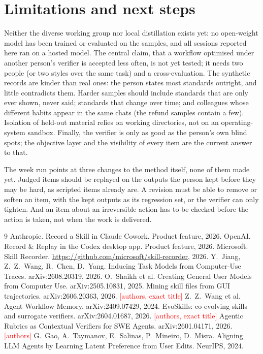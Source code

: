 \documentclass[10pt]{article}
\newcommand{\todo}[1]{\textcolor{red}{[#1]}}
\begin{document}
\section{Limitations and next steps}

Neither the diverse working group nor local distillation exists yet: no open-weight model has been trained or
evaluated on the samples, and all sessions reported here ran on a hosted model. The central claim, that a
workflow optimised under another person's verifier is accepted less often, is not yet tested; it needs two people (or two styles over the same task) and a cross-evaluation. The synthetic records are
kinder than real ones: the person states most standards outright, and little contradicts them. Harder samples
should include standards that are only ever shown, never said; standards that change over time; and colleagues
whose different habits appear in the same chats (the refund samples contain a few). Isolation of held-out material
relies on working directories, not on an operating-system sandbox. Finally, the verifier is only as good as the
person's own blind spots; the objective layer and the visibility of every item are the current answer to that.

The week run points at three changes to the method itself, none of them made yet. Judged items should be replayed
on the outputs the person kept before they may be hard, as scripted items already are. A revision must be able to
remove or soften an item, with the kept outputs as its regression set, or the verifier can only tighten. And an
item about an irreversible action has to be checked before the action is taken, not when the work is delivered.

\begin{thebibliography}{9}\small
{} Anthropic. Record a Skill in Claude Cowork. Product feature, 2026.
 OpenAI. Record \& Replay in the Codex desktop app. Product feature, 2026.
 Microsoft. Skill Recorder. \url{https://github.com/microsoft/skill-recorder}, 2026.
 Y.~Jiang, Z.~Z.~Wang, R.~Chen, D.~Yang. Inducing Task Models from Computer-Use Traces. arXiv:2608.20319, 2026.
 O.~Shaikh et al. Creating General User Models from Computer Use. arXiv:2505.10831, 2025.
 Mining skill files from GUI trajectories. arXiv:2606.20363, 2026. \todo{authors, exact title}
 Z.~Z.~Wang et al. Agent Workflow Memory. arXiv:2409.07429, 2024.
 EvoSkills: co-evolving skills and surrogate verifiers. arXiv:2604.01687, 2026. \todo{authors, exact title}
 Agentic Rubrics as Contextual Verifiers for SWE Agents. arXiv:2601.04171, 2026. \todo{authors}
 G.~Gao, A.~Taymanov, E.~Salinas, P.~Mineiro, D.~Misra. Aligning LLM Agents by Learning Latent Preference from User Edits. NeurIPS, 2024.
\end{thebibliography}
\end{document}
